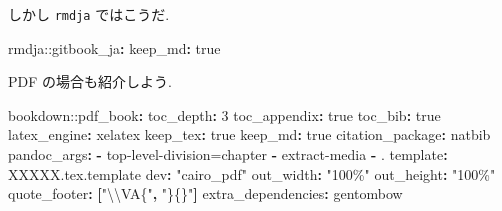 \documentclass[
  nomag]{bxjsbook}
\newenvironment{Shaded}{\begin{snugshade}}{\end{snugshade}}
\newcommand{\AttributeTok}[1]{\textcolor[rgb]{0.77,0.63,0.00}{#1}}
\newcommand{\CharTok}[1]{\textcolor[rgb]{0.31,0.60,0.02}{#1}}
\newcommand{\DecValTok}[1]{\textcolor[rgb]{0.00,0.00,0.81}{#1}}
\newcommand{\FunctionTok}[1]{\textcolor[rgb]{0.00,0.00,0.00}{#1}}
\newcommand{\KeywordTok}[1]{\textcolor[rgb]{0.13,0.29,0.53}{\textbf{#1}}}
\newcommand{\SpecialCharTok}[1]{\textcolor[rgb]{0.00,0.00,0.00}{#1}}
\newcommand{\StringTok}[1]{\textcolor[rgb]{0.31,0.60,0.02}{#1}}
\theoremstyle{definition}
\theoremstyle{definition}
\theoremstyle{definition}
\theoremstyle{remark}
\begin{document}
しかし \texttt{rmdja} ではこうだ.

\begin{Shaded}
\begin{Highlighting}[]
\AttributeTok{rmdja:}\FunctionTok{:gitbook\_ja}\KeywordTok{:}
\AttributeTok{  }\FunctionTok{keep\_md}\KeywordTok{:}\AttributeTok{ }\CharTok{true}
\end{Highlighting}
\end{Shaded}

PDF の場合も紹介しよう.

\begin{Shaded}
\begin{Highlighting}[]
\AttributeTok{bookdown:}\FunctionTok{:pdf\_book}\KeywordTok{:}
\AttributeTok{  }\FunctionTok{toc\_depth}\KeywordTok{:}\AttributeTok{ }\DecValTok{3}
\AttributeTok{  }\FunctionTok{toc\_appendix}\KeywordTok{:}\AttributeTok{ }\CharTok{true}
\AttributeTok{  }\FunctionTok{toc\_bib}\KeywordTok{:}\AttributeTok{ }\CharTok{true}
\AttributeTok{  }\FunctionTok{latex\_engine}\KeywordTok{:}\AttributeTok{ xelatex}
\AttributeTok{  }\FunctionTok{keep\_tex}\KeywordTok{:}\AttributeTok{ }\CharTok{true}
\AttributeTok{  }\FunctionTok{keep\_md}\KeywordTok{:}\AttributeTok{ }\CharTok{true}
\AttributeTok{  }\FunctionTok{citation\_package}\KeywordTok{:}\AttributeTok{ natbib}
\AttributeTok{  }\FunctionTok{pandoc\_args}\KeywordTok{:}
\AttributeTok{    }\KeywordTok{{-}}\AttributeTok{ }\StringTok{\textquotesingle{}{-}{-}top{-}level{-}division=chapter\textquotesingle{}}
\AttributeTok{    }\KeywordTok{{-}}\AttributeTok{ }\StringTok{\textquotesingle{}{-}{-}extract{-}media\textquotesingle{}}
\AttributeTok{    }\KeywordTok{{-}}\AttributeTok{ }\StringTok{\textquotesingle{}.\textquotesingle{}}
\AttributeTok{  }\FunctionTok{template}\KeywordTok{:}\AttributeTok{ XXXXX.tex.template\textquotesingle{}}
\AttributeTok{  }\FunctionTok{dev}\KeywordTok{:}\AttributeTok{ }\StringTok{"cairo\_pdf"}
\AttributeTok{  }\FunctionTok{out\_width}\KeywordTok{:}\AttributeTok{ }\StringTok{"100\%"}
\AttributeTok{  }\FunctionTok{out\_height}\KeywordTok{:}\AttributeTok{ }\StringTok{"100\%"}
\AttributeTok{  }\FunctionTok{quote\_footer}\KeywordTok{:}\AttributeTok{ }\KeywordTok{[}\StringTok{"}\SpecialCharTok{\textbackslash{}\textbackslash{}}\StringTok{VA\{"}\KeywordTok{,}\AttributeTok{ }\StringTok{"\}\{\}"}\KeywordTok{]}
\AttributeTok{  }\FunctionTok{extra\_dependencies}\KeywordTok{:}\AttributeTok{ gentombow}
\end{Highlighting}
\end{Shaded}
\end{document}
